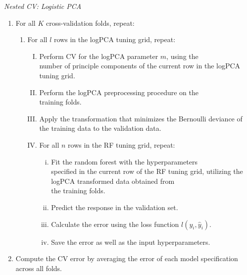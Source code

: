 \documentclass[a4paper,12pt, headsepline]{scrartcl}
\numberwithin{equation}{section}
\begin{document}
{\centering
	\begin{minipage}{.9\linewidth}
		\begin{algorithm}[H]
			\caption{\textit{Nested CV: Logistic PCA}}\label{alg:three}
			\begin{enumerate}
				\item For all $K$ cross-validation folds, repeat:
				\begin{enumerate}
					\item For all $l$ rows in the logPCA tuning grid, repeat:
					\begin{enumerate}[I.]
						\item Perform CV for the logPCA parameter $m$, using the\\ number of principle components of the current row in the logPCA tuning grid.
						\item Perform the logPCA preprocessing procedure on the\\ training folds.
						\item Apply the transformation that minimizes the Bernoulli deviance of the training data to the validation data.
						\item For all $n$ rows in the RF tuning grid, repeat:
						\begin{enumerate}[i.]
							\item Fit the random forest with the hyperparameters\\ specified in the current row of the RF tuning grid, utilizing the logPCA transformed data obtained from\\ the training folds.
							\item Predict the response in the validation set.
							\item Calculate the error using the loss function $l(y_i, \hat y_i)$.
							\item Save the error as well as the input hyperparameters.
						\end{enumerate}
					\end{enumerate} 
				\end{enumerate}
				\item Compute the CV error by averaging the error of each model specification across all folds.
			\end{enumerate}
		\end{algorithm}
	\end{minipage}
	\par
}
\end{document}
